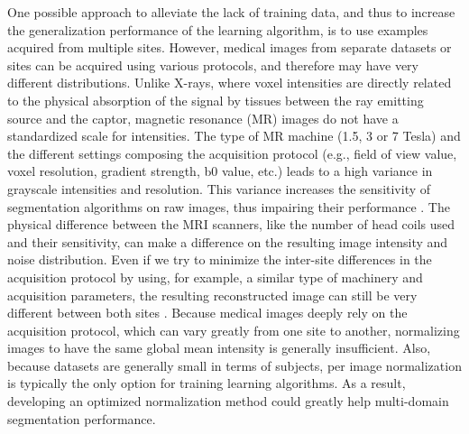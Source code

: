 \documentclass[preprint,12pt]{elsarticle}
\newcommand{\chris}[1]{\todo[fancyline,backgroundcolor=blue!25,bordercolor=blue]{\footnotesize{}Chris says: #1}}
\begin{document}
One possible approach to alleviate the lack of training data, and thus to increase the generalization performance of the learning algorithm, is to use examples acquired from multiple sites. However, medical images from separate datasets or sites can be acquired using various protocols, and therefore may have very different distributions. Unlike X-rays, where voxel intensities are directly related to the physical absorption of the signal by tissues between the ray emitting source and the captor, magnetic resonance (MR) images do not have a standardized scale for intensities. The type of MR machine (1.5, 3 or 7 Tesla) and the different settings composing the acquisition protocol (e.g., field of view value, voxel resolution, gradient strength, b0 value, etc.) leads to a high variance in grayscale intensities and resolution. This variance increases the sensitivity of segmentation algorithms on raw images, thus impairing their performance \cite{maartensson2020reliability}. The physical difference between the MRI scanners, like the number of head coils used and their sensitivity, can make a difference on the resulting image intensity and noise distribution. Even if we try to minimize the inter-site differences in the acquisition protocol by using, for example, a similar type of machinery and acquisition parameters, the resulting reconstructed image can still be very different between both sites \citep{Kochunov2014}. Because medical images deeply rely on the acquisition protocol, which can vary greatly from one site to another, normalizing images to have the same global mean intensity is generally insufficient.
Also, because datasets are generally small in terms of subjects, per image normalization is typically the only option for training learning algorithms. As a result, developing an optimized normalization method could greatly help multi-domain segmentation performance.
\end{document}

